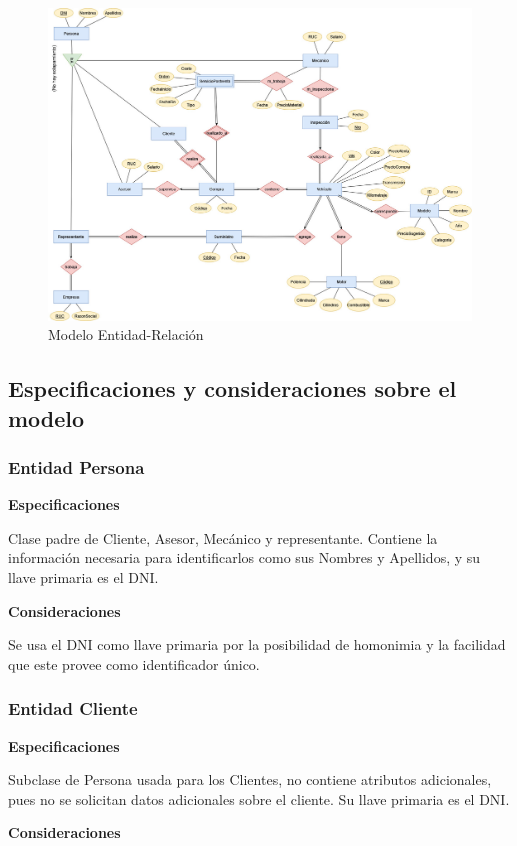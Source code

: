\documentclass[12pt]{article}
\begin{document}
\begin{figure}
\centering
\includegraphics[width=1\textwidth]{ER.jpg}
\caption{Modelo Entidad-Relación}
\end{figure}

\subsection{Especificaciones y consideraciones sobre el modelo}

\subsubsection{Entidad Persona}
\textbf{Especificaciones}

Clase padre de Cliente, Asesor, Mecánico y representante. Contiene la información necesaria para identificarlos como sus Nombres y Apellidos, y su llave primaria es el DNI.

\textbf{Consideraciones}

Se usa el DNI como llave primaria por la posibilidad de homonimia y la facilidad que este provee como identificador único.

\subsubsection{Entidad Cliente}
\textbf{Especificaciones}

Subclase de Persona usada para los Clientes, no contiene atributos adicionales, pues no se solicitan datos adicionales sobre el cliente. Su llave primaria es el DNI.

\textbf{Consideraciones}
\end{document}
